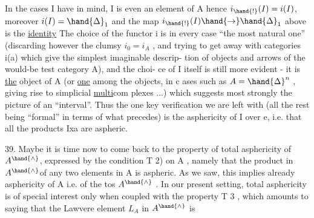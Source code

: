 In the cases I have in mind, I is even an element of A hence
$i_{\hand{!}}(I)=i(I)$, moreover $i(I)=\hand{\Delta}_1$ and the map $i_{\hand{!}}(I)\hand{\to}\hand{\Delta}_1$ above is the
\uline{identity} The choice of the functor i is in every case ``the most natural
one'' (discarding however the clumsy $i_0=i_A$ , and trying to get away
with categories i(a) which  give the simplest imaginable descrip-%
tion of objects and arrows of the would-be test category A), and the choi-%
ce of I itself is still more evident - it is \uline{the} object of A (or \uline{one} among
the objects, in c ases such as $A=\hand{\Delta}^n$ , giving rise to simplicial \uline{multi}com
plexes ...) which suggests most strongly the picture of an ``interval''. Thus
the one key verification we are left with (all the rest being ``formal'' in
terms of what precedes) is the asphericity of I over e, i.e. that all
the products Ixa are aspheric.

39. Maybe it is time now to come back to the property of total asphericity
of $A^{\hand{\wedge}}$, expressed by the condition T 2) on A , namely that the product in
$A^{\hand{\wedge}}$of any two elements in A is aspheric. As we saw,  this implies already
asphericity of A i.e. of  the tos $A^{\hand{\wedge}}$ . In our present setting, total
asphericity is of special interest only when coupled with the property
T 3 , which amounts to saying that the Lawvere element $L_A$ in $A^{\hand{\wedge}}$ is
